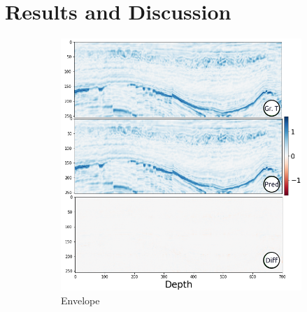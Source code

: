 \documentclass[conference]{IEEEtran}
\begin{document}
\section{Results and Discussion}
\label{sec:results}
\begin{figure}[!t]
     \centering
     \begin{subfigure}[b]{\figattwidth\textwidth}%
         \centering
        \includegraphics[width=0.98\columnwidth]{Fig/newFigs/envelope-half.png}
        \caption{Envelope}
        \label{fig:Envelope}
     \end{subfigure}
     \begin{subfigure}[b]{\figattwidth\textwidth}
         \centering

\end{subfigure}
\end{figure}
\end{document}
